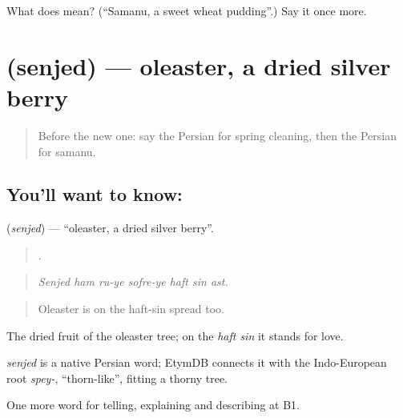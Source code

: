 \begin{tcolorbox}[breakable,colback=teal!4,colframe=teal!35!black,title={Before you move on}]
What does  mean? (\textquotedblleft{}Samanu, a sweet wheat pudding\textquotedblright{}.) Say it once more.
\end{tcolorbox}
\section[\texorpdfstring{\fa{سنجد} (senjed)}{سنجد (senjed)}]{ (senjed) — oleaster, a dried silver berry}

\label{lesson:FA-C339-senjed}



\begin{quote}
Before the new one: say the Persian for spring cleaning, then the Persian for samanu.
\end{quote}

\subsection*{You'll want to know: }
\textbf{} (\emph{senjed}) — \textquotedblleft{}oleaster, a dried silver berry\textquotedblright{}.

\begin{quote}
      .
\end{quote}

\begin{quote}
\emph{Senjed ham ru-ye sofre-ye haft sin ast.}
\end{quote}

\begin{quote}
Oleaster is on the haft-sin spread too.
\end{quote}

The dried fruit of the oleaster tree; on the \emph{haft sin} it stands for love.

\begin{cousinweb}
\emph{senjed} is a native Persian word; EtymDB connects it with the Indo-European root \emph{spey-}, \textquotedblleft{}thorn-like\textquotedblright{}, fitting a thorny tree.
\end{cousinweb}

\begin{grammarlens}[title={What you've built}]
One more word for telling, explaining and describing at B1.
\end{grammarlens}


